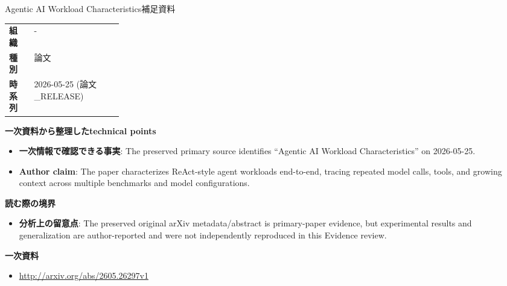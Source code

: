 \begin{technicalnote}{Agentic AI Workload Characteristics}{補足資料}
\begin{tabularx}{\linewidth}{@{}>{\bfseries}p{0.22\linewidth}X@{}}
組織 & - \\
種別 & 論文 \\
時系列 & 2026-05-25 (論文\_RELEASE) \\
\end{tabularx}
\smallskip
{\bfseries 一次資料から整理したtechnical points}
\begin{itemize}[leftmargin=1.5em,itemsep=0.35em]
\item \textbf{一次情報で確認できる事実}: The preserved primary source identifies “Agentic AI Workload Characteristics” on 2026-05-25.
\item \textbf{Author claim}: The paper characterizes ReAct-style agent workloads end-to-end, tracing repeated model calls, tools, and growing context across multiple benchmarks and model configurations.
\end{itemize}
{\bfseries 読む際の境界}
\begin{itemize}[leftmargin=1.5em,itemsep=0.35em]
\item \textbf{分析上の留意点}: The preserved original arXiv metadata/abstract is primary-paper evidence, but experimental results and generalization are author-reported and were not independently reproduced in this Evidence review.
\end{itemize}
{\bfseries 一次資料}
\begingroup\sloppy
\begin{itemize}[leftmargin=1.5em,itemsep=0.25em]
\item {\scriptsize\url{http://arxiv.org/abs/2605.26297v1}}
\end{itemize}
\endgroup
\end{technicalnote}
\medskip
